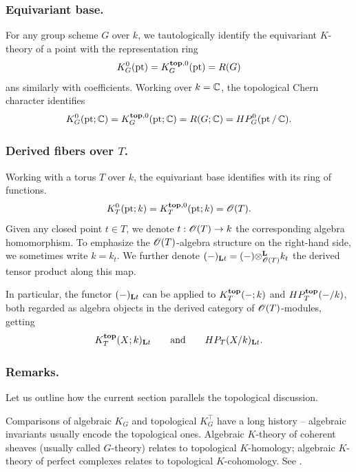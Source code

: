 \subsubsection{Equivariant base.}
For any group scheme $G$ over $k$, we tautologically identify the equivariant $K$-theory of a point with the representation ring
\begin{equation*}
    K^0_G(\operatorname{pt}) = K^{\mathbf{top}, 0}_G(\operatorname{pt}) = R(G)
\end{equation*}
ans similarly with coefficients.
Working over $k = \operatorname{\mathbb{C}}$, the topological Chern character identifies
\begin{equation*}
    K^0_G(\operatorname{pt}; \operatorname{\mathbb{C}}) = K^{\mathbf{top}, 0}_G(\operatorname{pt}; \operatorname{\mathbb{C}}) = R(G; \operatorname{\mathbb{C}}) = HP^0_G(\operatorname{pt} / \operatorname{\mathbb{C}}).
\end{equation*}


\subsubsection{Derived fibers over $T$.}
Working with a torus $T$ over $k$, the equivariant base identifies with its ring of functions.
\begin{equation*}
 K^{0}_T(\operatorname{pt}; k) = K^{\mathbf{top}, 0}_T(\operatorname{pt}; k) = \operatorname{\mathscr{O}}(T).   
\end{equation*}
Given any closed point $t \in T$, we denote $t: \operatorname{\mathscr{O}}(T)\to k$ the corresponding algebra homomorphism. To emphasize the $\operatorname{\mathscr{O}}(T)$-algebra structure on the right-hand side, we sometimes write $k = k_t$. We further denote $(-)_{\mathbf{L} t} = (-) {\otimes^{\mathbf{L}}_{\operatorname{\mathscr{O}}(T)}} k_t$ the derived tensor product along this map. 

In particular, the functor $(-)_{\mathbf{L} t}$ can be applied to $K^{\mathbf{top}}_T(-; k)$ and $HP^{\mathbf{top}}_T(- / k)$, both regarded as algebra objects in the derived category of $\operatorname{\mathscr{O}}(T)$-modules, getting
\begin{equation*}
    K^{\mathbf{top}}_T(X; k)_{\mathbf{L} t} \qquad \text{and} \qquad HP_T(X / k)_{\mathbf{L} t}.
\end{equation*}

\subsubsection{Remarks.}
Let us outline how the current section parallels the topological discussion.

\begin{remark}[Comparisons]
Comparisons of algebraic $K_G$ and topological $K^{\top}_G$ have a long history -- algebraic invariants usually encode the topological ones. Algebraic $K$-theory of coherent sheaves (usually called $G$-theory) relates to topological $K$-homology; algebraic $K$-theory of perfect complexes relates to topological $K$-cohomology. See \cite{Tho88, Tho88b}.
\end{remark} 

